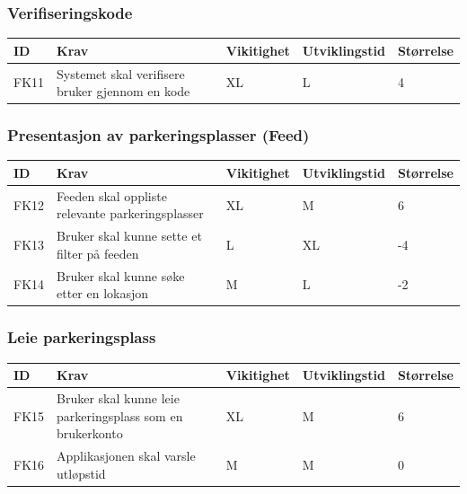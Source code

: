 \documentclass[12pt]{article}
\newcommand{\cellr}{\cellcolor{red!25}}
\newcommand{\cello}{\cellcolor{orange!25}}
\newcommand{\celly}{\cellcolor{yellow!25}}
\newcommand{\cellg}{\cellcolor{green!25}}
\begin{document}
        \subsubsection{Verifiseringskode}
        
        \begin{tabular}{|p{2cm}|p{6cm}|
            >{\centering\arraybackslash}p{2cm}|
            >{\centering\arraybackslash}p{2cm}|
            >{\centering\arraybackslash}p{2cm}|} 
            \hline
            \bf ID & \bf Krav & \bf Vikitighet & \bf Utviklingstid & \bf Størrelse\\
            \hline
            FK11
            &
            Systemet skal verifisere bruker gjennom en kode
            & XL & L & \cellg 4\\
            \hline
        \end{tabular}
        
        \subsubsection{Presentasjon av parkeringsplasser (Feed)}
        
        \begin{tabular}{|p{2cm}|p{6cm}|
            >{\centering\arraybackslash}p{2cm}|
            >{\centering\arraybackslash}p{2cm}|
            >{\centering\arraybackslash}p{2cm}|} 
            \hline
            \bf ID & \bf Krav & \bf Vikitighet & \bf Utviklingstid & \bf Størrelse\\
            \hline
            FK12
            &
            Feeden skal oppliste relevante parkeringsplasser
            & XL & M & \cellg 6\\
            \hline
            FK13
            &
            Bruker skal kunne sette et filter på feeden
            & L & XL & \cellr -4\\
            \hline
            FK14
            &
            Bruker skal kunne søke etter en lokasjon
            & M & L & \cello -2\\
            \hline
        \end{tabular}
        
        \subsubsection{Leie parkeringsplass}
        
        \begin{tabular}{|p{2cm}|p{6cm}|
            >{\centering\arraybackslash}p{2cm}|
            >{\centering\arraybackslash}p{2cm}|
            >{\centering\arraybackslash}p{2cm}|} 
            \hline
            \bf ID & \bf Krav & \bf Vikitighet & \bf Utviklingstid & \bf Størrelse\\
            \hline
            FK15
            &
            Bruker skal kunne leie parkeringsplass som en brukerkonto
            & XL & M & \cellg 6\\
            \hline
            FK16
            &
            Applikasjonen skal varsle utløpstid
            & M & M & \celly 0\\
            \hline
        \end{tabular}
        
\end{document}
